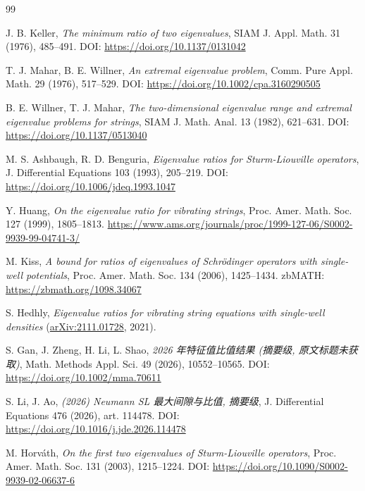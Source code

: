 \documentclass[UTF8]{ctexart}
\begin{document}
\begin{thebibliography}{99}

 J. B. Keller, \emph{The minimum ratio of two eigenvalues},
	SIAM J. Appl. Math. 31 (1976), 485--491.
	DOI: \url{https://doi.org/10.1137/0131042}

 T. J. Mahar, B. E. Willner, \emph{An extremal eigenvalue problem},
	Comm. Pure Appl. Math. 29 (1976), 517--529.
	DOI: \url{https://doi.org/10.1002/cpa.3160290505}

 B. E. Willner, T. J. Mahar, \emph{The two-dimensional eigenvalue range
	and extremal eigenvalue problems for strings}, SIAM J. Math. Anal. 13 (1982), 621--631.
	DOI: \url{https://doi.org/10.1137/0513040}

 M. S. Ashbaugh, R. D. Benguria, \emph{Eigenvalue ratios for Sturm-Liouville
	operators}, J. Differential Equations 103 (1993), 205--219.
	DOI: \url{https://doi.org/10.1006/jdeq.1993.1047}

 Y. Huang, \emph{On the eigenvalue ratio for vibrating strings},
	Proc. Amer. Math. Soc. 127 (1999), 1805--1813.
	\url{https://www.ams.org/journals/proc/1999-127-06/S0002-9939-99-04741-3/}

 M. Kiss, \emph{A bound for ratios of eigenvalues of Schr\"odinger operators
	with single-well potentials}, Proc. Amer. Math. Soc. 134 (2006), 1425--1434.
	zbMATH: \url{https://zbmath.org/1098.34067}

 S. Hedhly, \emph{Eigenvalue ratios for vibrating string equations with single-well densities} (\href{https://arxiv.org/abs/2111.01728}{arXiv:2111.01728}, 2021).



 S. Gan, J. Zheng, H. Li, L. Shao, \emph{2026 年特征值比值结果 (摘要级, 原文标题未获取)}, Math. Methods Appl. Sci. 49 (2026), 10552--10565. DOI: \url{https://doi.org/10.1002/mma.70611}



 S. Li, J. Ao, \emph{(2026) Neumann SL 最大间隙与比值, 摘要级},
	J. Differential Equations 476 (2026), art. 114478.
	DOI: \url{https://doi.org/10.1016/j.jde.2026.114478}

 M. Horv\'ath, \emph{On the first two eigenvalues of Sturm-Liouville
	operators}, Proc. Amer. Math. Soc. 131 (2003), 1215--1224.
	DOI: \url{https://doi.org/10.1090/S0002-9939-02-06637-6}

\end{thebibliography}
\end{document}
